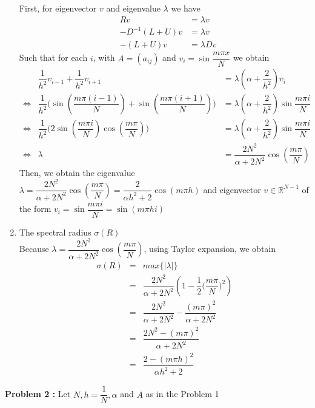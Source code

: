 \documentclass[a4paper,10pt]{article}
\newcommand{\R}{\mathbb{R}}
\begin{document}
\begin{enumerate}[label=(\alph*)]
		First, for eigenvector $ v $ and eigenvalue $ \lambda $ we have
		\begin{eqnarray}\nonumber
		&Rv &=\lambda v\\ \nonumber
		&-D^{-1}(L+U)v &= \lambda v \\ \nonumber
		&-(L+U)v &= \lambda D v 
		\end{eqnarray}
		Such that for each $ i $, with $ A=(a_{ij}) $ and $ v_{i} = \sin \dfrac{m\pi x}{N} $ we obtain
		\begin{eqnarray} \nonumber
		&\dfrac{1}{h^2}v_{i-1}+\dfrac{1}{h^2}v_{i+1} &= \lambda (\alpha+\dfrac{2}{h^2})v_{i}\\ \nonumber
		\Leftrightarrow &\dfrac{1}{h^2} \Big( \sin(\dfrac{m\pi (i-1)}{N}) + \sin(\dfrac{m\pi (i+1)}{N}) \Big) &= \lambda (\alpha+\dfrac{2}{h^2})\sin \dfrac{m\pi i}{N}\\ \nonumber
		\Leftrightarrow &\dfrac{1}{h^2} \Big( 2 \sin(\dfrac{m\pi i}{N}) \cos(\dfrac{m\pi}{N}) \Big) &= \lambda (\alpha+\dfrac{2}{h^2})\sin \dfrac{m\pi i}{N}\\ \nonumber
		\Leftrightarrow & \lambda &= \dfrac{2N^2 }{\alpha + 2N^2}\cos(\dfrac{m\pi}{N})
		\end{eqnarray}
		Then, we obtain the eigenvalue $  \lambda = \dfrac{2N^2 }{\alpha + 2N^2} \cos(\dfrac{m\pi}{N}) = \dfrac{2}{\alpha h^2+ 2} \cos(m\pi h)$ and eigenvector $ v\in\R^{N-1} $ of the form $ v_{i} = \sin \dfrac{m\pi i}{N} =\sin(m\pi h i)$
		\item The spectral radius $ \sigma(R) $\\
		Because $  \lambda = \dfrac{2N^2 }{\alpha + 2N^2} \cos(\dfrac{m\pi}{N})$, using Taylor expansion, we obtain
		\begin{eqnarray}\nonumber
		\sigma(R) &=& max\{|\lambda|\} \\ \nonumber
		&=& \dfrac{2N^2 }{\alpha + 2N^2}(1-\dfrac{1}{2}\big(\dfrac{m\pi}{N}\big)^2) \\ \nonumber
		&=& \dfrac{2N^2 }{\alpha + 2N^2} - \dfrac{(m\pi)^2 }{\alpha + 2N^2}\\ \nonumber
		&=& \dfrac{2N^2-(m\pi)^2 }{\alpha + 2N^2}\\ \nonumber
		&=& \dfrac{2-(m\pi h)^2}{\alpha h^2+2}
		\end{eqnarray}
	\end{enumerate}
	
	\textbf{Problem 2 :}
	Let $ N, h =\dfrac{1}{N}, \alpha $ and $ A $ as in the Problem 1
	
\end{document}
